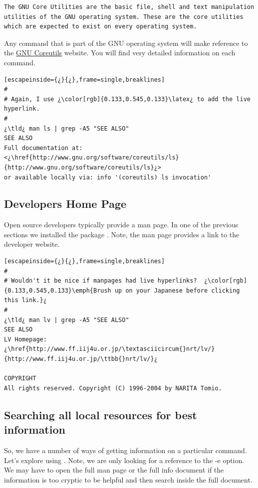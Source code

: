 \begin{lstlisting}
The GNU Core Utilities are the basic file, shell and text manipulation utilities of the GNU operating system. These are the core utilities which are expected to exist on every operating system. 
\end{lstlisting}

Any command that is part of the GNU operating system will make reference to the \href{https://www.gnu.org/software/coreutils/manual/coreutils.html#Top}{GNU Coreutils} website. You will find very detailed information on each command.

\begin{lstlisting}[escapeinside={¿}{¿},frame=single,breaklines]
#
# Again, I use ¿\color[rgb]{0.133,0.545,0.133}\latex¿ to add the live hyperlink.
#
¿\tld¿ man ls | grep -A5 "SEE ALSO"
SEE ALSO
Full documentation at: <¿\href{http://www.gnu.org/software/coreutils/ls}{http://www.gnu.org/software/coreutils/ls}¿>
or available locally via: info '(coreutils) ls invocation'
\end{lstlisting}

\subsection{Developers Home Page}

Open source developers typically provide a man page. In one of the previous sections we installed the  package . Note, the man page provides a link to the developer website.

\begin{lstlisting}[escapeinside={¿}{¿},frame=single,breaklines]
#
# Wouldn't it be nice if manpages had live hyperlinks?  ¿\color[rgb]{0.133,0.545,0.133}\emph{Brush up on your Japanese before clicking this link.}¿
#
¿\tld¿ man lv | grep -A5 "SEE ALSO"
SEE ALSO
LV Homepage: ¿\href{http://www.ff.iij4u.or.jp/\textasciicircum{}nrt/lv/}{http://www.ff.iij4u.or.jp/\ttbb{}nrt/lv/}¿

COPYRIGHT
All rights reserved. Copyright (C) 1996-2004 by NARITA Tomio.
\end{lstlisting}

\subsection{Searching all local resources for best information}

So, we have a number of ways of getting information on a particular command. Let's explore using . Note, we are only looking for a reference to the -e option. We may have to open the full man page or the full info document if the information is too cryptic to be helpful and then search inside the full document.

